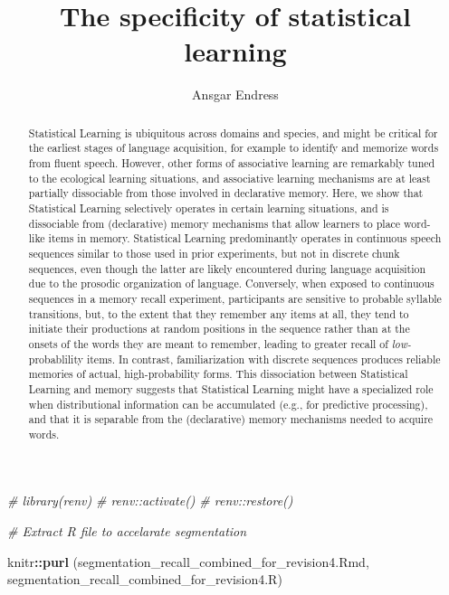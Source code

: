 \documentclass[
]{article}
\title{The specificity of statistical learning}
\author{Ansgar Endress}
\date{}
\newenvironment{Shaded}{\begin{snugshade}}{\end{snugshade}}
\newcommand{\CommentTok}[1]{\textcolor[rgb]{0.56,0.35,0.01}{\textit{#1}}}
\newcommand{\FunctionTok}[1]{\textcolor[rgb]{0.13,0.29,0.53}{\textbf{#1}}}
\newcommand{\NormalTok}[1]{#1}
\newcommand{\SpecialCharTok}[1]{\textcolor[rgb]{0.81,0.36,0.00}{\textbf{#1}}}
\newcommand{\StringTok}[1]{\textcolor[rgb]{0.31,0.60,0.02}{#1}}
\begin{document}
\maketitle
\begin{abstract}
Statistical Learning is ubiquitous across domains and species, and might
be critical for the earliest stages of language acquisition, for example
to identify and memorize words from fluent speech. However, other forms
of associative learning are remarkably tuned to the ecological learning
situations, and associative learning mechanisms are at least partially
dissociable from those involved in declarative memory. Here, we show
that Statistical Learning selectively operates in certain learning
situations, and is dissociable from (declarative) memory mechanisms that
allow learners to place word-like items in memory. Statistical Learning
predominantly operates in continuous speech sequences similar to those
used in prior experiments, but not in discrete chunk sequences, even
though the latter are likely encountered during language acquisition due
to the prosodic organization of language. Conversely, when exposed to
continuous sequences in a memory recall experiment, participants are
sensitive to probable syllable transitions, but, to the extent that they
remember any items at all, they tend to initiate their productions at
random positions in the sequence rather than at the onsets of the words
they are meant to remember, leading to greater recall of
\emph{low-}probablility items. In contrast, familiarization with
discrete sequences produces reliable memories of actual,
high-probability forms. This dissociation between Statistical Learning
and memory suggests that Statistical Learning might have a specialized
role when distributional information can be accumulated (e.g., for
predictive processing), and that it is separable from the (declarative)
memory mechanisms needed to acquire words.
\end{abstract}

{
\setcounter{tocdepth}{5}
\tableofcontents
}
\begin{Shaded}
\begin{Highlighting}[]
\CommentTok{\# library(renv)}
\CommentTok{\# renv::activate()}
\CommentTok{\# renv::restore()}
\end{Highlighting}
\end{Shaded}

\begin{Shaded}
\begin{Highlighting}[]
\CommentTok{\# Extract R file to accelarate segmentation}

\NormalTok{knitr}\SpecialCharTok{::}\FunctionTok{purl}\NormalTok{ (}\StringTok{\textquotesingle{}segmentation\_recall\_combined\_for\_revision4.Rmd\textquotesingle{}}\NormalTok{, }
      \StringTok{\textquotesingle{}segmentation\_recall\_combined\_for\_revision4.R\textquotesingle{}}\NormalTok{)}
\end{Highlighting}
\end{Shaded}
\end{document}
